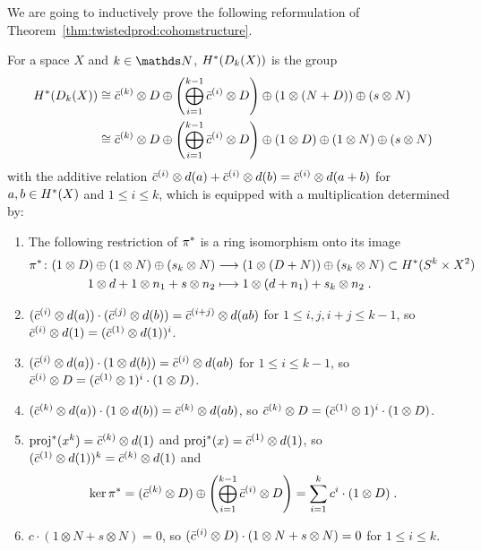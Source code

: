 We are going to inductively prove the following reformulation of
Theorem~\ref{thm:twistedprod:cohomstructure}.
\begin{Thm}\label{thm:twistedprod:cohomstructure:alt}
  For a space $X$ and $k\in\Nat$, $H^*(D_{k}({X}))$ is the group
  \begin{align*}
    H^*(D_{k}({X}))
    &\cong
      \bar c^{(k)}\otimes D
      \oplus \left(\bigoplus_{i=1}^{k-1} \bar c^{(i)}\otimes D\right)
      \oplus (1\otimes(N+D))
      \oplus (s\otimes N)
    \\
    &\cong
      \bar c^{(k)}\otimes D
      \oplus \left(\bigoplus_{i=1}^{k-1} \bar c^{(i)}\otimes D\right)
      \oplus (1\otimes D)
      \oplus (1\otimes N)
      \oplus (s\otimes N)
  \end{align*}
  with the additive relation
  $\bar c^{(i)}\otimes d(a) + \bar c^{(i)}\otimes d(b)=\bar c^{(i)}\otimes d(a+b)$ for
  $a,b\in H^*(X)$ and $1\leq i\leq k$,
  which is equipped with a multiplication determined by:
  \begin{enumerate}
  \item\label{twistedprodcohom:proof:0}
    The following restriction of ${\pi}^*$ is a ring isomorphism onto
    its image
    \begin{align*}
      {\pi}^*\colon
      (1\otimes D)\oplus (1\otimes N)\oplus(s_k \otimes N)
      &\longrightarrow
        (1\otimes(D+N))\oplus(s_k\otimes N)
        \subset H^*(S^{k}\times X^2)
      \\
      1\otimes d + 1\otimes n_1 + s\otimes n_2
      &\longmapsto
        1\otimes(d+n_1) + s_k\otimes n_2
        \;.
    \end{align*}
  \item\label{twistedprodcohom:proof:1}
    $(\bar c^{(i)}\otimes d(a))\cdot (\bar c^{(j)}\otimes d(b))
    = \bar c^{(i+j)}\otimes d(ab)$ for $1\leq i,j,i+j\leq k-1$,
    so $\bar c^{(i)}\otimes d(1) = (\bar c^{(1)}\otimes d(1))^i$.
  \item\label{twistedprodcohom:proof:2}
    $(\bar c^{(i)}\otimes d(a))\cdot(1\otimes d(b))
    = \bar c^{(i)}\otimes d(ab)$ for $1\leq i\leq k-1$,
    so $\bar c^{(i)}\otimes D = (\bar c^{(1)}\otimes 1)^i\cdot (1\otimes D)$.
  \item\label{twistedprodcohom:proof:3}
    $(\bar c^{(k)}\otimes d(a))\cdot(1\otimes d(b))
    = \bar c^{(k)}\otimes d(ab)$,
    so $\bar c^{(k)}\otimes D = (\bar c^{(1)}\otimes 1)^i\cdot (1\otimes D)$.
  \item\label{twistedprodcohom:proof:4}
    ${\mathrm{proj}}^*(x^k) = \bar c^{(k)}\otimes d(1)$ and
    ${\mathrm{proj}}^*(x) = \bar c^{(1)}\otimes d(1)$,
    so $(\bar c^{(1)}\otimes d(1))^k = \bar c^{(k)}\otimes d(1)$ and
    \begin{gather*}
      \ker{\pi}^*
      = (\bar c^{(k)}\otimes D)
      \oplus \left( \bigoplus_{i=1}^{k-1}\bar c^{(i)}\otimes D \right)
      = \sum_{i=1}^k c^i\cdot (1\otimes D)
      \;.
    \end{gather*}
  \item\label{twistedprodcohom:proof:5}
    $c\cdot (1\otimes N + s\otimes N) = 0$,
    so $(\bar c^{(i)} \otimes D)\cdot (1\otimes N + s\otimes N) = 0$
    for $1\leq i\leq k$.
  \end{enumerate}
\end{Thm}

